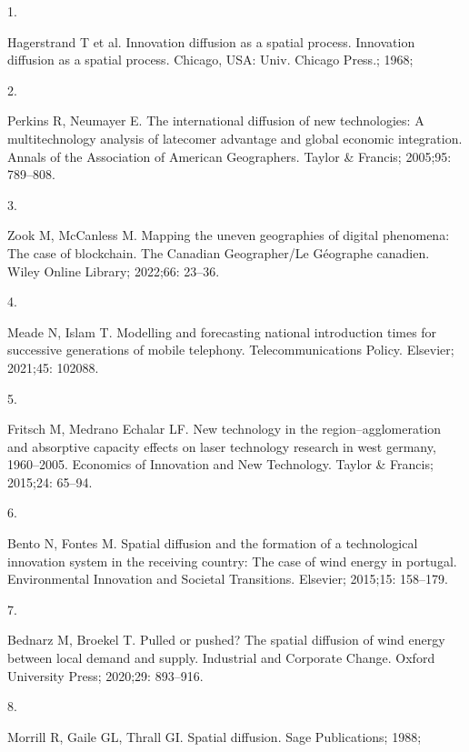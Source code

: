 \documentclass[10pt,letterpaper]{article}
\newlength{\cslhangindent}
\newlength{\csllabelwidth}
\newlength{\cslentryspacingunit} %
\newenvironment{CSLReferences}[2] %
 {%
  \setlength{\parindent}{0pt}
  \ifodd #1
  \let\oldpar\par
  \def\par{\hangindent=\cslhangindent\oldpar}
  \fi
  \setlength{\parskip}{#2\cslentryspacingunit}
 }%
 {}
\newcommand{\CSLLeftMargin}[1]{\parbox[t]{\csllabelwidth}{#1}}
\newcommand{\CSLRightInline}[1]{\parbox[t]{\linewidth - \csllabelwidth}{#1}\break}
\begin{document}
\hypertarget{refs}{}
\begin{CSLReferences}{0}{0}
\leavevmode{}%
\CSLLeftMargin{1. }%
\CSLRightInline{Hagerstrand T et al. Innovation diffusion as a spatial
process. Innovation diffusion as a spatial process. Chicago, USA: Univ.
Chicago Press.; 1968; }

\leavevmode{}%
\CSLLeftMargin{2. }%
\CSLRightInline{Perkins R, Neumayer E. The international diffusion of
new technologies: A multitechnology analysis of latecomer advantage and
global economic integration. Annals of the Association of American
Geographers. Taylor \& Francis; 2005;95: 789--808. }

\leavevmode{}%
\CSLLeftMargin{3. }%
\CSLRightInline{Zook M, McCanless M. Mapping the uneven geographies of
digital phenomena: The case of blockchain. The Canadian Geographer/Le
G{é}ographe canadien. Wiley Online Library; 2022;66: 23--36. }

\leavevmode{}%
\CSLLeftMargin{4. }%
\CSLRightInline{Meade N, Islam T. Modelling and forecasting national
introduction times for successive generations of mobile telephony.
Telecommunications Policy. Elsevier; 2021;45: 102088. }

\leavevmode{}%
\CSLLeftMargin{5. }%
\CSLRightInline{Fritsch M, Medrano Echalar LF. New technology in the
region--agglomeration and absorptive capacity effects on laser
technology research in west germany, 1960--2005. Economics of Innovation
and New Technology. Taylor \& Francis; 2015;24: 65--94. }

\leavevmode{}%
\CSLLeftMargin{6. }%
\CSLRightInline{Bento N, Fontes M. Spatial diffusion and the formation
of a technological innovation system in the receiving country: The case
of wind energy in portugal. Environmental Innovation and Societal
Transitions. Elsevier; 2015;15: 158--179. }

\leavevmode{}%
\CSLLeftMargin{7. }%
\CSLRightInline{Bednarz M, Broekel T. Pulled or pushed? The spatial
diffusion of wind energy between local demand and supply. Industrial and
Corporate Change. Oxford University Press; 2020;29: 893--916. }

\leavevmode{}%
\CSLLeftMargin{8. }%
\CSLRightInline{Morrill R, Gaile GL, Thrall GI. Spatial diffusion. Sage
Publications; 1988; }


\end{CSLReferences}
\end{document}
